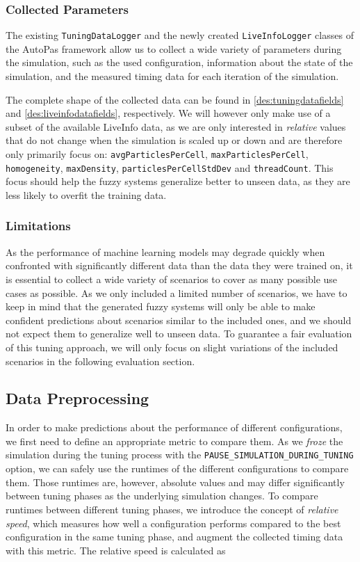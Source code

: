 \subsubsection{Collected Parameters}

The existing \texttt{TuningDataLogger} and the newly created \texttt{LiveInfoLogger} classes of the AutoPas framework allow us to collect a wide variety of parameters during the simulation, such as the used configuration, information about the state of the simulation, and the measured timing data for each iteration of the simulation.

The complete shape of the collected data can be found in \autoref{des:tuningdatafields} and \autoref{des:liveinfodatafields}, respectively. We will however only make use of a subset of the available LiveInfo data, as we are only interested in \emph{relative} values that do not change when the simulation is scaled up or down and are therefore only primarily focus on: \texttt{avgParticlesPerCell}, \texttt{maxParticlesPerCell}, \texttt{homogeneity}, \texttt{maxDensity}, \texttt{particlesPerCellStdDev} and \texttt{threadCount}. This focus should help the fuzzy systems generalize better to unseen data, as they are less likely to overfit the training data.


\subsubsection{Limitations}

As the performance of machine learning models may degrade quickly when confronted with significantly different data than the data they were trained on, it is essential to collect a wide variety of scenarios to cover as many possible use cases as possible. As we only included a limited number of scenarios, we have to keep in mind that the generated fuzzy systems will only be able to make confident predictions about scenarios similar to the included ones, and we should not expect them to generalize well to unseen data.
To guarantee a fair evaluation of this tuning approach, we will only focus on slight variations of the included scenarios in the following evaluation section.

\subsection{Data Preprocessing}

In order to make predictions about the performance of different configurations, we first need to define an appropriate metric to compare them. As we \emph{froze} the simulation during the tuning process with the \texttt{PAUSE\_SIMULATION\_DURING\_TUNING} option, we can safely use the runtimes of the different configurations to compare them. Those runtimes are, however, absolute values and may differ significantly between tuning phases as the underlying simulation changes. To compare runtimes between different tuning phases, we introduce the concept of \emph{relative speed}, which measures how well a configuration performs compared to the best configuration in the same tuning phase, and augment the collected timing data with this metric. The relative speed is calculated as


